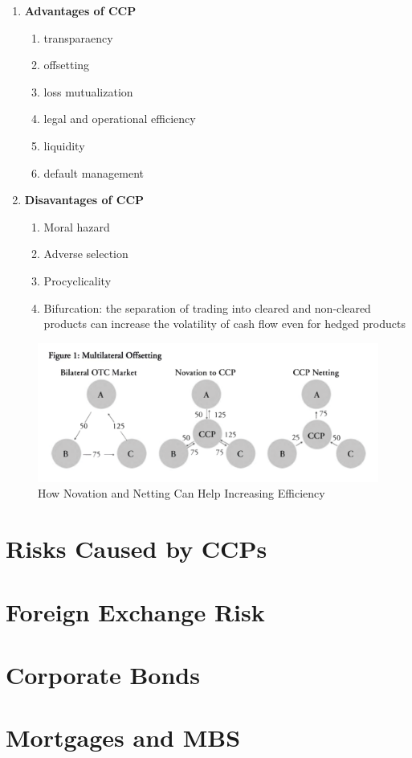 \documentclass[11pt,fleqn]{report} %
\numberwithin{equation}{section} %
\numberwithin{figure}{section} %
\numberwithin{table}{section} %
\begin{document}
 \begin{definition}
    \begin{enumerate}
        \item \textbf{Advantages of CCP}
        \begin{enumerate}
            \item transparaency
            \item offsetting
            \item loss mutualization
            \item legal and operational efficiency
            \item liquidity
            \item default management
        \end{enumerate}
        \item \textbf{Disavantages of CCP}
        \begin{enumerate}
            \item Moral hazard
            \item Adverse selection
            \item Procyclicality
            \item Bifurcation: the separation of trading into cleared and non-cleared
            products can increase the volatility of cash flow even for hedged products
        \end{enumerate}
    \end{enumerate}
 \end{definition}
 \begin{figure}[h!]
    \begin{center}
        \includegraphics[scale=0.7]{clearing.png}
        \caption{How Novation and Netting Can Help Increasing Efficiency}
    \end{center}
 \end{figure}
\chapter{Risks Caused by CCPs}
 
\chapter{Foreign Exchange Risk}
 
\chapter{Corporate Bonds}

\chapter{Mortgages and MBS}
 
 
\end{document}
